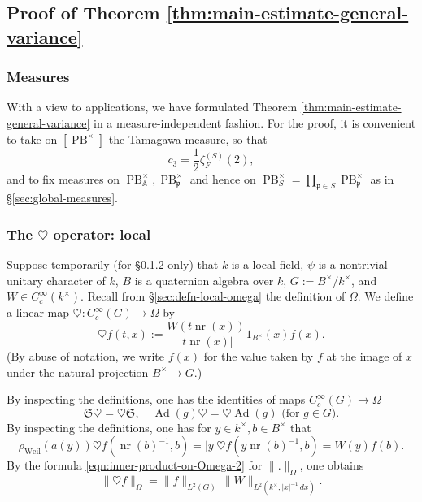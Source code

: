 \documentclass[reqno,10pt]{amsart}
\theoremstyle{plain} %
\theoremstyle{definition}
\theoremstyle{plain} %
\theoremstyle{remark}
\theoremstyle{itplain} %
\theoremstyle{remark} %
\numberwithin{equation}{section}
\DeclareMathOperator{\Ad}{Ad}
\def\PB{\operatorname{PB}}
\DeclareMathOperator{\Weil}{Weil}
\DeclareMathOperator{\nr}{nr}
\begin{document}
\subsection{Proof of Theorem \ref{thm:main-estimate-general-variance}}\label{sec:proof-theor-refthm:m}

\subsubsection{Measures}
\label{sec-4-5-1}
With a view to applications, we have formulated Theorem \ref{thm:main-estimate-general-variance} in a measure-independent fashion.  For the proof, it is convenient to take on $[\PB^\times]$ the Tamagawa measure, so that
\begin{equation}\label{eq:defn-of-c-2}
  c_3 = \frac{1}{2}  \zeta_F^{(S)}(2),
\end{equation}
and to fix measures on $\PB^\times_{\mathbb{A}}, \PB^\times_\mathfrak{p}$ and hence on $\PB^\times_S = \prod_{\mathfrak{p} \in S} \PB^\times_\mathfrak{p}$ as in \S\ref{sec:global-measures}.

\subsubsection{The $\heartsuit$ operator: local}
\label{sec-2-5}
Suppose temporarily (for \S\ref{sec-2-5} only) that $k$ is a local field, $\psi$ is a nontrivial unitary character of $k$, $B$ is a quaternion algebra over $k$, $G := B^\times / k^\times$, and $W \in C_c^\infty(k^\times)$.  Recall from \S\ref{sec:defn-local-omega} the definition of $\Omega$.  We define a linear map $\heartsuit : C_c^\infty(G) \rightarrow \Omega$ by
\begin{equation}
  \heartsuit f(t,x)
  :=
  \frac{W(t \nr(x))}{|t \nr(x)|}
  1_{B^\times}(x)
  f(x).
\end{equation}
(By abuse of notation, we write $f(x)$ for the value taken by $f$ at the image of $x$ under the natural projection $B^\times \rightarrow G$.)

By inspecting the definitions, one has the identities of maps $C_c^\infty(G) \rightarrow \Omega$
\[
  \mathfrak{S} \heartsuit = \heartsuit \mathfrak{S}, \quad \Ad(g) \heartsuit = \heartsuit \Ad(g) \text{ (for $g \in G$)}.
\]
By inspecting the definitions, one has for $y \in k^\times, b \in B^\times$ that
\begin{equation}\label{eqn:local-heartsuit-formula}
  \rho_{\Weil}(a(y)) \heartsuit f(\nr(b)^{-1},b)
  =
  |y| \heartsuit f(y \nr(b)^{-1}, b)
  =
  W(y) f(b).
\end{equation}
By the formula \eqref{eqn:inner-product-on-Omega-2} for $\|.\|_{\Omega}$, one obtains
\begin{equation}
  \label{eqn:local-norm-heartsuit-f}
  \|\heartsuit f\|_{\Omega} =
  \|f\|_{L^2(G)} \,
  \|W\|_{L^2(k^\times, |x|^{-1} \, d x)}.
\end{equation}
\end{document}
